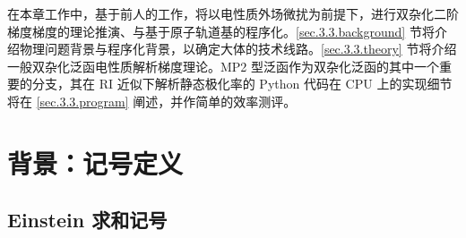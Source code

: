 在本章工作中，基于前人的工作\cite{Gerratt-Mills.JCP.1968, Gerratt-Mills.JCP.1968a, Pople-Binkley.IJQC.1979, Dykstra-Jasien.CPL.1984, Handy-Schaefer.JCP.1984, Handy-Simandiras.CPL.1985, Pulay-Saeboe.TCA.1986, Trucks-Bartlett.CPL.1988, Frisch-Pople.CP.1990, Frisch-Pople.CPL.1990, Frisch-Pople.CPL.1990a, Gauss-Bartlett.JCP.1992, Stanton-Bartlett.CPL.1992, Johnson-Frisch.CPL.1993, Head-Gordon-Head-Gordon.CPL.1994, Yamaguchi-Schaefer.Oxford.1994, Weigend-Haeser.TCA.1997, Aikens-Gordon.TCA.2003, Cammi-Frisch.TCA.2004, Distasio-Head-Gordon.JCC.2007, Neese-Grimme.JCP.2007, Biczysko-Barone.JCTC.2010, Su-Xu.JCC.2013, Ji-Jung.JCTC.2013, Bykov-Neese.MP.2015, Stoychev-Neese.JCTC.2018, Gu-Xu.JCTC.2021, Yan-Xu.JCTC.2022}，将以电性质外场微扰为前提下，进行双杂化二阶梯度梯度的理论推演、与基于原子轨道基的程序化。\ref{sec.3.3.background} 节将介绍物理问题背景与程序化背景，以确定大体的技术线路。\ref{sec.3.3.theory} 节将介绍一般双杂化泛函电性质解析梯度理论。MP2 型泛函作为双杂化泛函的其中一个重要的分支，其在 RI 近似下解析静态极化率的 Python 代码在 CPU 上的实现细节将在 \ref{sec.3.3.program} 阐述，并作简单的效率测评。

\section{背景：记号定义}

\subsection{Einstein 求和记号}

